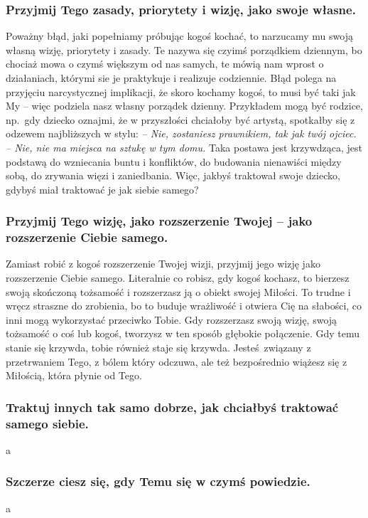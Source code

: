 \subsubsection{Przyjmij Tego zasady, priorytety i wizję, jako swoje własne.}
Poważny błąd, jaki popełniamy próbując kogoś kochać, to narzucamy mu swoją własną wizję, priorytety i zasady.
Te nazywa się czyimś porządkiem dziennym, bo chociaż mowa o czymś większym od nas samych, te mówią nam wprost o działaniach, którymi sie je praktykuje i realizuje codziennie.
Błąd polega na przyjęciu narcystycznej implikacji, że skoro kochamy kogoś, to musi być taki jak My -- więc podziela nasz własny porządek dzienny.
Przykładem mogą być rodzice, np.\ gdy dziecko oznajmi, że w przyszłości chciałoby być artystą, spotkałby się z odzewem najbliższych w stylu: \emph{-- Nie, zostaniesz prawnikiem, tak jak twój ojciec. -- Nie, nie ma miejsca na sztukę w tym domu.}
Taka postawa jest krzywdząca, jest podstawą do wzniecania buntu i konfliktów, do budowania nienawiści między sobą, do zrywania więzi i zaniedbania.
Więc, jakbyś traktował swoje dziecko, gdybyś miał traktować je jak siebie samego?

\subsubsection{Przyjmij Tego wizję, jako rozszerzenie Twojej -- jako rozszerzenie Ciebie samego.}
Zamiast robić z kogoś rozszerzenie Twojej wizji, przyjmij jego wizję jako rozszerzenie Ciebie samego.
Literalnie co robisz, gdy kogoś kochasz, to bierzesz swoją skończoną tożsamość i rozszerzasz ją o obiekt swojej Miłości.
To trudne i wręcz straszne do zrobienia, bo to buduje wrażliwość i otwiera Cię na słabości, co inni mogą wykorzystać przeciwko Tobie.
Gdy rozszerzasz swoją wizję, swoją tożsamość o coś lub kogoś, tworzysz w ten sposób głębokie połączenie.
Gdy temu stanie się krzywda, tobie również staje się krzywda.
Jesteś związany z przetrwaniem Tego, z bólem który odczuwa, ale też bezpośrednio wiążesz się z Miłością, która płynie od Tego.

\subsubsection{Traktuj innych tak samo dobrze, jak chciałbyś traktować samego siebie.}
a 
\subsubsection{Szczerze ciesz się, gdy Temu się w czymś powiedzie.}
a 
